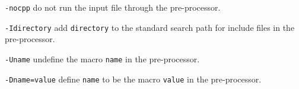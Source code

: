 \begin{dispitems}
\item [\tt -nocpp]
   	do not run the input file through the pre-processor.

\item [\tt -Idirectory]
	add {\tt directory} to the standard search path for include files in
	the pre-processor.

\item [\tt -Uname]
   	undefine the macro {\tt name} in the pre-processor.

\item [\tt -Dname=value]
	define {\tt name} to be the macro {\tt value} in the pre-processor.
\end{dispitems}
